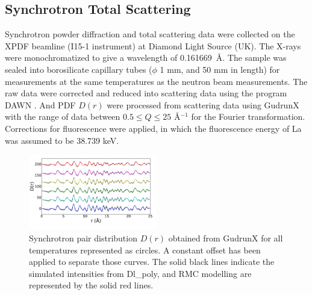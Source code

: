 \documentclass[twoside,twocolumn,9pt]{article}
\begin{document}
\subsection{Synchrotron  Total Scattering}
Synchrotron powder diffraction and total scattering data were collected on the XPDF beamline (I15-1 instrument) at Diamond Light Source (UK).
The X-rays were monochromatized to give a wavelength of 0.161669~\AA.
The sample was sealed into borosilicate capillary tubes ($\phi$ 1 mm, and 50 mm in length) for measurements at the same temperatures as the neutron beam measurements. The raw data  were corrected and reduced into scattering data using the program DAWN \cite{Basham:2015cf}.
And PDF $D(r)$ were processed from scattering data using GudrunX \cite{Soper:2011fda,Soper:2012vs} with the range of data between $0.5 \le Q \le 25$ \AA$^{-1}$ for the Fourier transformation. Corrections for fluorescence were applied, in which the fluorescence energy of La was assumed to be 38.739 keV.

\begin{figure}[t]
\centering
\includegraphics[width=0.5\textwidth]{Pics/xpdf.pdf}
\caption{Synchrotron pair distribution $D(r)$ obtained from GudrunX for all temperatures represented as circles.
 A constant offset has been applied to separate those curves.
 The solid black lines indicate the  simulated intensities from Dl\_poly, and RMC modelling are represented by the solid red lines.
 }
\label{fig:xpdf}
\end{figure}
\end{document}
